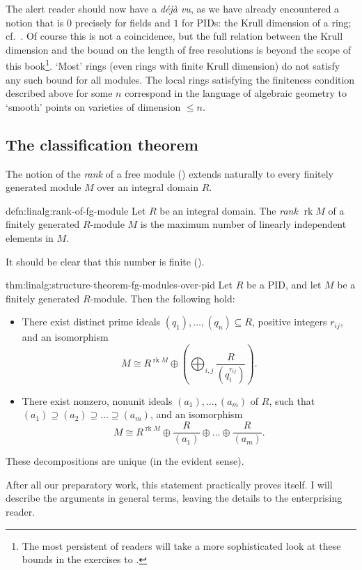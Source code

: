The alert reader should now have a \emph{d\'ej\`{a} vu}, as we have
already encountered a notion that is $0$ precisely for fields and $1$
for PIDs: the Krull dimension of a ring; cf.\
. Of course this is not a
coincidence, but the full relation between the Krull dimension and the
bound on the length of free resolutions is beyond the scope of this
book\footnote{The most persistent of readers will take a more
  sophisticated look at these bounds in the exercises to
  .}. `Most' rings (even rings
with finite Krull dimension) do not satisfy any such bound for all
modules. The local rings satisfying the finiteness condition described
above for some $n$ correspond in the language of algebraic geometry to
`smooth' points on varieties of dimension $\leq n$.

\subsection{The classification theorem}
\label{subsec:linalg:the-classification-theorem}
The notion of the \emph{rank} of a free module ()
extends naturally to every finitely generated module $M$ over an
integral domain $R$.
\begin{defn}{}{defn:linalg:rank-of-fg-module}
  Let $R$ be an integral domain. The \emph{rank} $\operatorname{rk} M$
  of a finitely generated $R$-module $M$ is the maximum number of
  linearly independent elements in $M$.
\end{defn}
It should be clear that this number is finite
().

\begin{thm}{}{thm:linalg:structure-theorem-fg-modules-over-pid}
  Let $R$ be a PID, and let $M$ be a finitely generated
  $R$-module. Then the following hold:
  \begin{itemize}
  \item There exist distinct prime ideals
    $(q_1), \dots, (q_n) \subseteq R$, positive integers $r_{ij}$, and
    an isomorphism
    \[
      M \cong R^{\operatorname{rk} M} \oplus \left( \bigoplus_{i,j}
        \frac{R}{(q_i^{r_{ij}})} \right).
    \]
  \item There exist nonzero, nonunit ideals $(a_1), \dots, (a_m)$ of
    $R$, such that
    $(a_1) \supseteq (a_2) \supseteq \dots \supseteq (a_m)$, and an
    isomorphism
    \[
      M \cong R^{\operatorname{rk} M} \oplus \frac{R}{(a_1)} \oplus
      \dots \oplus \frac{R}{(a_m)}.
    \]
  \end{itemize}
  These decompositions are unique (in the evident sense).
\end{thm}
After all our preparatory work, this statement practically proves
itself. I will describe the arguments in general terms, leaving the
details to the enterprising reader.

